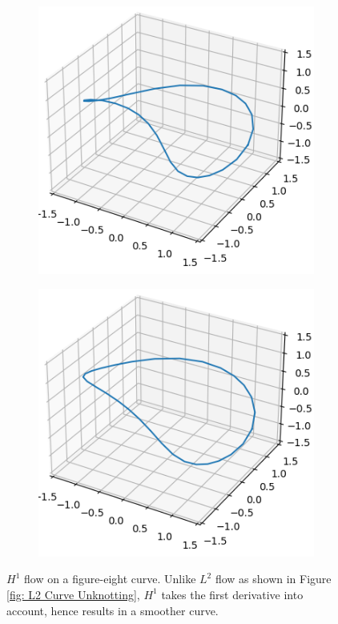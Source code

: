 \documentclass[../dissertation.tex]{subfiles}
\begin{document}
\begin{figure}[tbp]
\begin{subfigure}[b]{0.32\textwidth}
        \includegraphics[width=\textwidth]{sections/unknottingCurveImgs/figure8-H1-1}
    \end{subfigure}
    \begin{subfigure}[b]{0.32\textwidth}
        \centering
        \includegraphics[width=\textwidth]{sections/unknottingCurveImgs/figure8-H1-2}
    \end{subfigure}

    \caption{$H^1$ flow on a figure-eight curve. Unlike $L^2$ flow as shown in Figure \ref{fig: L2 Curve Unknotting}, $H^1$ takes the first derivative into account, hence results in a smoother curve.}
    \label{fig: H1 Curve Unknotting}
\end{figure}
\end{document}
